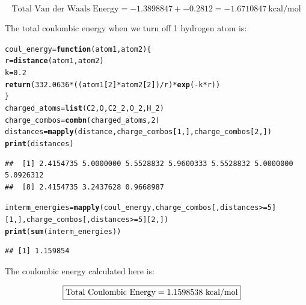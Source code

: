 \documentclass{article}\usepackage[]{graphicx}\usepackage[]{color}
\makeatletter
\newcommand{\hlnum}[1]{\textcolor[rgb]{0.686,0.059,0.569}{#1}}%
\newcommand{\hlopt}[1]{\textcolor[rgb]{0,0,0}{#1}}%
\newcommand{\hlstd}[1]{\textcolor[rgb]{0.345,0.345,0.345}{#1}}%
\newcommand{\hlkwa}[1]{\textcolor[rgb]{0.161,0.373,0.58}{\textbf{#1}}}%
\newcommand{\hlkwb}[1]{\textcolor[rgb]{0.69,0.353,0.396}{#1}}%
\newcommand{\hlkwc}[1]{\textcolor[rgb]{0.333,0.667,0.333}{#1}}%
\newcommand{\hlkwd}[1]{\textcolor[rgb]{0.737,0.353,0.396}{\textbf{#1}}}%
\newenvironment{kframe}{%
 \def\at@end@of@kframe{}%
 \ifinner\ifhmode%
  \def\at@end@of@kframe{\end{minipage}}%
  \begin{minipage}{\columnwidth}%
 \fi\fi%
 \def\FrameCommand##1{\hskip\@totalleftmargin \hskip-\fboxsep
 \colorbox{shadecolor}{##1}\hskip-\fboxsep
     \hskip-\linewidth \hskip-\@totalleftmargin \hskip\columnwidth}%
 \MakeFramed {\advance\hsize-\width
   \@totalleftmargin\z@ \linewidth\hsize
   \@setminipage}}%
 {\par\unskip\endMakeFramed%
 \at@end@of@kframe}
\newenvironment{knitrout}{}{} %
\makeatother
\begin{document}
$$\boxed{\text{Total Van der Waals Energy}=-1.3898847+-0.2812=-1.6710847\ \text{kcal/mol}}$$

The total coulombic energy when we turn off 1 hydrogen atom is:

\begin{knitrout}
\color{fgcolor}\begin{kframe}
\begin{alltt}
  \hlstd{coul_energy}\hlkwb{=}\hlkwa{function}\hlstd{(}\hlkwc{atom1}\hlstd{,}\hlkwc{atom2}\hlstd{)\{}
    \hlstd{r}\hlkwb{=}\hlkwd{distance}\hlstd{(atom1,atom2)}
    \hlstd{k}\hlkwb{=}\hlnum{0.2}
    \hlkwd{return}\hlstd{(}\hlnum{332.0636}\hlopt{*}\hlstd{((atom1[}\hlnum{2}\hlstd{]}\hlopt{*}\hlstd{atom2[}\hlnum{2}\hlstd{])}\hlopt{/}\hlstd{r)}\hlopt{*}\hlkwd{exp}\hlstd{(}\hlopt{-}\hlstd{k}\hlopt{*}\hlstd{r))}
  \hlstd{\}}
  \hlstd{charged_atoms} \hlkwb{=} \hlkwd{list}\hlstd{(C2,O,C2_2,O_2,H_2)}
  \hlstd{charge_combos} \hlkwb{=} \hlkwd{combn}\hlstd{(charged_atoms,}\hlnum{2}\hlstd{)}
  \hlstd{distances}\hlkwb{=}\hlkwd{mapply}\hlstd{(distance,charge_combos[}\hlnum{1}\hlstd{,],charge_combos[}\hlnum{2}\hlstd{,])}
  \hlkwd{print}\hlstd{(distances)}
\end{alltt}
\begin{verbatim}
##  [1] 2.4154735 5.0000000 5.5528832 5.9600333 5.5528832 5.0000000 5.0926312
##  [8] 2.4154735 3.2437628 0.9668987
\end{verbatim}
\begin{alltt}
  \hlstd{interm_energies} \hlkwb{=} \hlkwd{mapply}\hlstd{(coul_energy,charge_combos[,distances}\hlopt{>=}\hlnum{5}\hlstd{][}\hlnum{1}\hlstd{,],charge_combos[,distances}\hlopt{>=}\hlnum{5}\hlstd{][}\hlnum{2}\hlstd{,])}
  \hlkwd{print}\hlstd{(}\hlkwd{sum}\hlstd{(interm_energies))}
\end{alltt}
\begin{verbatim}
## [1] 1.159854
\end{verbatim}
\end{kframe}
\end{knitrout}

The coulombic energy calculated here is:

\begin{align*}
  \Aboxed{\text{Total Coulombic Energy}=1.1598538\ \text{kcal/mol}}
\end{align*}
\end{document}
